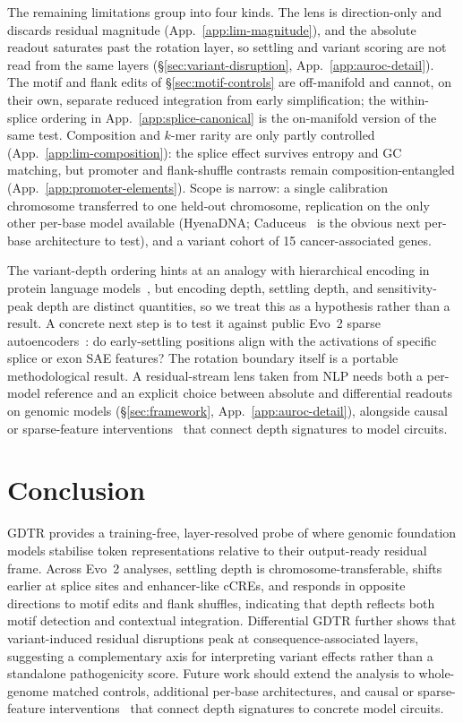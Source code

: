 \documentclass{article}
\theoremstyle{plain}
\theoremstyle{definition}
\theoremstyle{remark}
\newcommand{\gDTR}{\textsc{GDTR}}
\begin{document}
The remaining limitations group into four kinds. The lens is direction-only and discards residual magnitude (App.~\ref{app:lim-magnitude}), and the absolute readout saturates past the rotation layer, so settling and variant scoring are not read from the same layers (\S\ref{sec:variant-disruption}, App.~\ref{app:auroc-detail}). The motif and flank edits of \S\ref{sec:motif-controls} are off-manifold and cannot, on their own, separate reduced integration from early simplification; the within-splice ordering in App.~\ref{app:splice-canonical} is the on-manifold version of the same test. Composition and $k$-mer rarity are only partly controlled (App.~\ref{app:lim-composition}): the splice effect survives entropy and GC matching, but promoter and flank-shuffle contrasts remain composition-entangled (App.~\ref{app:promoter-elements}). Scope is narrow: a single calibration chromosome transferred to one held-out chromosome, replication on the only other per-base model available (HyenaDNA; Caduceus~\cite{schiff2024caduceus} is the obvious next per-base architecture to test), and a variant cohort of 15 cancer-associated genes.

The variant-depth ordering hints at an analogy with hierarchical encoding in protein language models~\cite{banerjee2025neuronlabelling}, but encoding depth, settling depth, and sensitivity-peak depth are distinct quantities, so we treat this as a hypothesis rather than a result. A concrete next step is to test it against public Evo~2 sparse autoencoders~\cite{deng2025interpreting}: do early-settling positions align with the activations of specific splice or exon SAE features? The rotation boundary itself is a portable methodological result. A residual-stream lens taken from NLP needs both a per-model reference and an explicit choice between absolute and differential readouts on genomic models (\S\ref{sec:framework}, App.~\ref{app:auroc-detail}), alongside causal or sparse-feature interventions~\cite{cunningham2023sparse,meng2022rome} that connect depth signatures to model circuits.

\section{Conclusion}
\label{sec:conclusion}

\gDTR{} provides a training-free, layer-resolved probe of where genomic foundation models stabilise token representations relative to their output-ready residual frame. Across Evo~2 analyses, settling depth is chromosome-transferable, shifts earlier at splice sites and enhancer-like cCREs, and responds in opposite directions to motif edits and flank shuffles, indicating that depth reflects both motif detection and contextual integration. Differential \gDTR{} further shows that variant-induced residual disruptions peak at consequence-associated layers, suggesting a complementary axis for interpreting variant effects rather than a standalone pathogenicity score. Future work should extend the analysis to whole-genome matched controls, additional per-base architectures, and causal or sparse-feature interventions~\cite{cunningham2023sparse,meng2022rome} that connect depth signatures to concrete model circuits.
\end{document}
